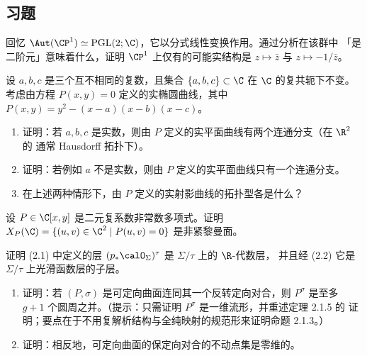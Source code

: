 \subsection*{习题}

\begin{exercise}\label{ex:2.1.17}
回忆 $\Aut(\CP^1)\simeq\mathrm{PGL}(2;\C)$，它以分式线性变换作用。通过分析在该群中
「是二阶元」意味着什么，证明 $\CP^1$ 上仅有的可能实结构是 $z\mapsto\bar z$ 与
$z\mapsto-1/\bar z$。
\end{exercise}

\begin{exercise}\label{ex:2.1.18}
设 $a,b,c$ 是三个互不相同的复数，且集合 $\{a,b,c\}\subset\C$ 在 $\C$ 的复共轭下不变。
考虑由方程 $P(x,y)=0$ 定义的实椭圆曲线，其中 $P(x,y)=y^2-(x-a)(x-b)(x-c)$。
\begin{enumerate}[label=(\roman*), leftmargin=2.2em, itemsep=0.15em]
\item 证明：若 $a,b,c$ 是实数，则由 $P$ 定义的实平面曲线有两个连通分支（在 $\R^2$ 的
      通常 Hausdorff 拓扑下）。
\item 证明：若例如 $a$ 不是实数，则由 $P$ 定义的实平面曲线只有一个连通分支。
\item 在上述两种情形下，由 $P$ 定义的实射影曲线的拓扑型各是什么？
\end{enumerate}
\end{exercise}

\begin{exercise}\label{ex:2.1.19}
设 $P\in\C[x,y]$ 是二元复系数非常数多项式。证明
$X_P(\C)=\{(u,v)\in\C^2\mid P(u,v)=0\}$ 是非紧黎曼面。
\end{exercise}

\begin{exercise}\label{ex:2.1.20}
证明 (2.1) 中定义的层 $(p_*\calO_\Sigma)^\tau$ 是 $\Sigma/\tau$ 上的 $\R$-代数层，
并且经 (2.2) 它是 $\Sigma/\tau$ 上光滑函数层的子层。
\end{exercise}

\begin{exercise}\label{ex:2.1.21}
\begin{enumerate}[label=(\roman*), leftmargin=2.2em, itemsep=0.15em]
\item 证明：若 $(P,\sigma)$ 是可定向曲面连同其一个反转定向对合，则 $P^\sigma$ 是至多
      $g+1$ 个圆周之并。（提示：只需证明 $P^\sigma$ 是一维流形，并重述定理 2.1.5 的
      证明；要点在于不用复解析结构与全纯映射的规范形来证明命题 2.1.3。）
\item 证明：相反地，可定向曲面的保定向对合的不动点集是零维的。
\end{enumerate}
\end{exercise}

